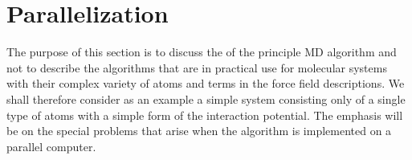 %
%
%
%
%
%
%

\section{Parallelization}
\label{sec:par}

\newcommand{\abs}[1]{\mid \! {#1} \! \mid}

The purpose of this section is to discuss the 
 of the 
principle MD algorithm and not to describe the algorithms that are in 
practical use for molecular systems with their complex variety of atoms 
and terms in the force field descriptions. We shall therefore consider 
as an example a simple system consisting only of a single type of atoms 
with a simple form of the interaction potential. The emphasis will be 
on the special problems that arise when the algorithm is implemented on 
a parallel computer. 

